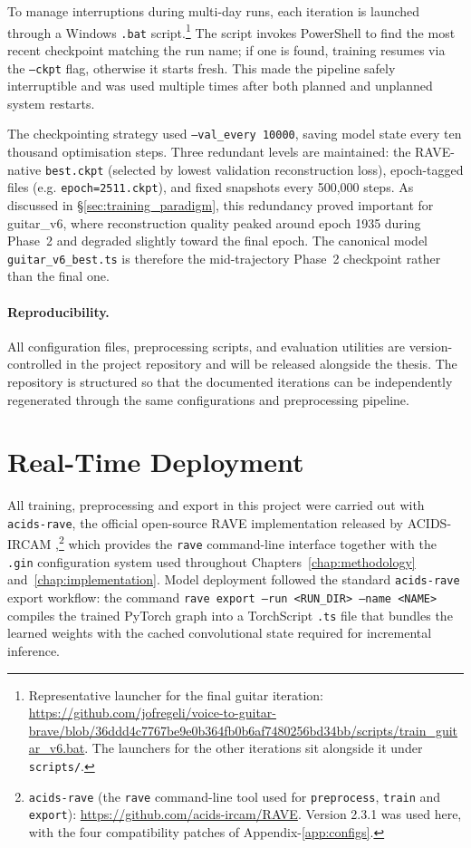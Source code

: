 \documentclass[a4paper,11pt,oneside,openany]{book}
\begin{document}
To manage interruptions during multi-day runs, each iteration is launched through a Windows \texttt{.bat} script.\footnote{Representative launcher for the final guitar iteration: \url{https://github.com/jofregeli/voice-to-guitar-brave/blob/36ddd4c7767be9e0b364fb0b6af7480256bd34bb/scripts/train_guitar_v6.bat}. The launchers for the other iterations sit alongside it under \texttt{scripts/}.} The script invokes PowerShell to find the most recent checkpoint matching the run name; if one is found, training resumes via the \texttt{--ckpt} flag, otherwise it starts fresh. This made the pipeline safely interruptible and was used multiple times after both planned and unplanned system restarts.

The checkpointing strategy used \texttt{--val\_every 10000}, saving model state every ten thousand optimisation steps. Three redundant levels are maintained: the RAVE-native \texttt{best.ckpt} (selected by lowest validation reconstruction loss), epoch-tagged files (e.g. \texttt{epoch=2511.ckpt}), and fixed snapshots every 500,000 steps. As discussed in \S\ref{sec:training_paradigm}, this redundancy proved important for guitar\_v6, where reconstruction quality peaked around epoch 1935 during Phase~2 and degraded slightly toward the final epoch. The canonical model \texttt{guitar\_v6\_best.ts} is therefore the mid-trajectory Phase~2 checkpoint rather than the final one.

\paragraph{Reproducibility.} All configuration files, preprocessing scripts, and evaluation utilities are version-controlled in the project repository and will be released alongside the thesis. The repository is structured so that the documented iterations can be independently regenerated through the same configurations and preprocessing pipeline.

\section{Real-Time Deployment}\label{sec:rt_deployment}

All training, preprocessing and export in this project were carried out with \texttt{acids-rave}, the official open-source RAVE implementation released by ACIDS-IRCAM \parencite{caillon2021rave},\footnote{\texttt{acids-rave} (the \texttt{rave} command-line tool used for \texttt{preprocess}, \texttt{train} and \texttt{export}): \url{https://github.com/acids-ircam/RAVE}. Version 2.3.1 was used here, with the four compatibility patches of Appendix-\ref{app:configs}.} which provides the \texttt{rave} command-line interface together with the \texttt{.gin} configuration system used throughout Chapters~\ref{chap:methodology} and~\ref{chap:implementation}. Model deployment followed the standard \texttt{acids-rave} export workflow: the command \texttt{rave export --run <RUN\_DIR> --name <NAME>} compiles the trained PyTorch graph into a TorchScript \texttt{.ts} file that bundles the learned weights with the cached convolutional state required for incremental inference.
\end{document}
